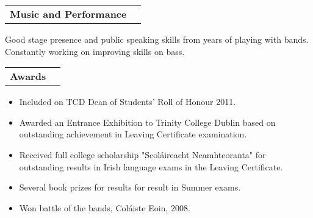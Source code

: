 \documentclass[11pt]{article}
\makeatletter
\newenvironment{resumeSubSectionHeader}{
    \par
    \begin{tabular*}{\textwidth}{l@{\extracolsep{\fill}}r}
    \par
} {
    \end{tabular*}
    \par
}
\newenvironment{resumeSubSectionBody}{
    \par
    \vspace{-0.8\parskip}
    \begin{small}
    \par
} {
    \par
    \end{small}
    \par
}
\makeatother
\begin{document}
%
%
\begin{resumeSubSectionHeader}

    \textbf{Music and Performance}

\end{resumeSubSectionHeader}
\begin{resumeSubSectionBody}

    Good stage presence and public speaking skills
        from years of playing with bands.
    Constantly working on improving skills on bass.

\end{resumeSubSectionBody}


%
%
\begin{resumeSubSectionHeader}

    \textbf{Awards}

\end{resumeSubSectionHeader}
\begin{resumeSubSectionBody}

    \begin{itemize}
        \item
            Included on TCD Dean of Students' Roll of Honour 2011.

        \item
            Awarded an Entrance Exhibition to Trinity College Dublin
            based on outstanding achievement in Leaving Certificate
            examination.

        \item
            Received full college scholarship "Scol\'aireacht Neamhteoranta"
            for outstanding results in Irish language exams in the
            Leaving Certificate.

        \item
            Several book prizes for results for result in Summer exams.

        \item
            Won battle of the bands, Col\'aiste Eoin, 2008.
    \end{itemize}

\end{resumeSubSectionBody}


\end{document}
